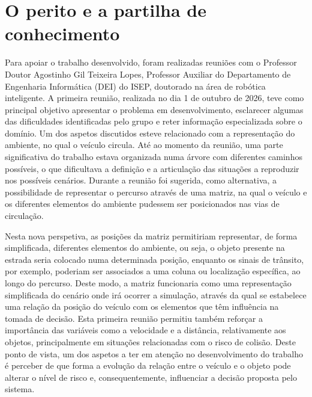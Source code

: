 \section{O perito e a partilha de conhecimento}
\label{sec:perito}

Para apoiar o trabalho desenvolvido, foram realizadas reuniões com o
Professor Doutor Agostinho Gil Teixeira Lopes, Professor Auxiliar do
Departamento de Engenharia Informática (DEI) do ISEP, doutorado na área de
robótica inteligente. A primeira reunião, realizada no dia 1 de outubro de
2026, teve como principal objetivo apresentar o problema em desenvolvimento,
esclarecer algumas das dificuldades identificadas pelo grupo e reter
informação especializada sobre o domínio. Um dos aspetos discutidos esteve
relacionado com a representação do ambiente, no qual o veículo circula. Até ao
momento da reunião, uma parte significativa do trabalho estava organizada
numa árvore com diferentes caminhos possíveis, o que dificultava a definição e
a articulação das situações a reproduzir nos possíveis cenários. Durante a
reunião foi sugerida, como alternativa, a possibilidade de representar o
percurso através de uma matriz, na qual o veículo e os diferentes elementos do
ambiente pudessem ser posicionados nas vias de circulação.

Nesta nova perspetiva, as posições da matriz permitiriam representar, de
forma simplificada, diferentes elementos do ambiente, ou seja, o objeto
presente na estrada seria colocado numa determinada posição, enquanto os
sinais de trânsito, por exemplo, poderiam ser associados a uma coluna ou
localização específica, ao longo do percurso. Deste modo, a matriz
funcionaria como uma representação simplificada do cenário onde irá ocorrer a
simulação, através da qual se estabelece uma relação da posição do veículo
com os elementos que têm influência na tomada de decisão. Esta primeira
reunião permitiu também reforçar a importância das variáveis como a
velocidade e a distância, relativamente aos objetos, principalmente em
situações relacionadas com o risco de colisão. Deste ponto de vista, um dos
aspetos a ter em atenção no desenvolvimento do trabalho é perceber de que
forma a evolução da relação entre o veículo e o objeto pode alterar o nível de
risco e, consequentemente, influenciar a decisão proposta pelo sistema.

